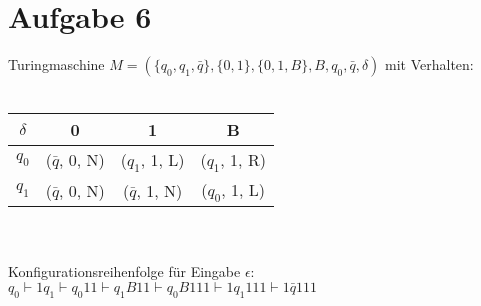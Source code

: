 \documentclass[a4paper,11pt]{scrartcl}
\begin{document}
	\section*{Aufgabe 6}
	Turingmaschine $M= (\{q_0 , q_1 , \bar{q}\}, \{0,1\}, \{0,1,B\}, B, q_0, \bar{q}, \delta)$ mit Verhalten:\\\\
	\begin{tabular}{c | c c c}
	$\delta$ & 0 & 1 & B \\
	\hline
	$q_0$ & ($\bar{q}$, 0, N) & ($q_1$, 1, L) & ($q_1$, 1, R) \\
	$q_1$ & ($\bar{q}$, 0, N) & ($\bar{q}$, 1, N) & ($q_0$, 1, L) \\
	\end{tabular}
	\\\\Konfigurationsreihenfolge für Eingabe $\epsilon$: \\
	$q_0 \vdash 1 q_1 \vdash q_0 11 \vdash q_1 B11 \vdash q_0 B111 \vdash 1 q_1 111 \vdash 1 \bar{q} 111$
	
\end{document}
